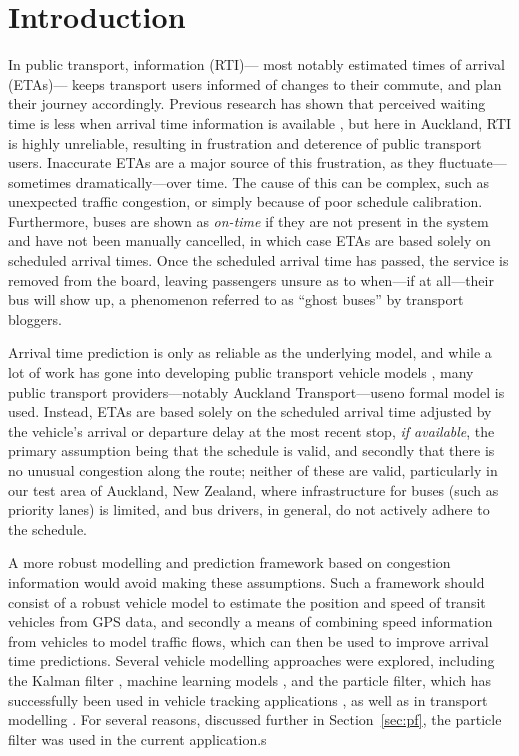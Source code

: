 \section{Introduction}
\label{sec:intro}


In public transport, \rt information (RTI)---%
most notably estimated times of arrival (ETAs)---%
keeps transport users informed of changes to their commute,
and plan their journey accordingly.
Previous research has shown that perceived waiting time is less
when arrival time information is available \citep{TCRP_2003b},
but here in Auckland, RTI is highly unreliable,
resulting in frustration and deterence of public transport users.
Inaccurate ETAs are a major source of this frustration,
as they fluctuate---sometimes dramatically---over time.
The cause of this can be complex, such as unexpected traffic congestion,
or simply because of poor schedule calibration.
Furthermore, buses are shown as \emph{on-time} 
if they are not present in the \rt system and have not been manually cancelled,
in which case ETAs are based solely on scheduled arrival times.
Once the scheduled arrival time has passed,
the service is removed from the \rt board,
leaving passengers unsure as to when---if at all---their bus will show up,
a phenomenon referred to as ``ghost buses'' by transport bloggers.


Arrival time prediction is only as reliable as the underlying model,
and while a lot of work has gone into developing public transport vehicle models
\citep{Cathey_2003,Jeong_2005,Yu_2011,Hans_2015},
many public transport providers---notably Auckland Transport---useno formal model is used.
Instead, ETAs are based solely on the scheduled arrival time
adjusted by the vehicle's arrival or departure delay at the most recent stop, 
\emph{if available},
the primary assumption being that the schedule is valid,
and secondly that there is no unusual congestion along the route;
neither of these are valid,
particularly in our test area of Auckland, New Zealand,
where infrastructure for buses (such as priority lanes) is limited,
and bus drivers, in general, 
do not actively adhere to the schedule.


A more robust modelling and prediction framework 
based on \rt congestion information would avoid making these assumptions.
Such a framework should consist of a robust vehicle model to estimate the position and speed
of transit vehicles from \rt GPS data,
and secondly a means of combining speed information from vehicles
to model traffic flows,
which can then be used to improve arrival time predictions.
Several vehicle modelling approaches were explored, 
including the Kalman filter \citep{Dailey_2001,Cathey_2003},
machine learning models \citep{Yu_2006,Chang_2010},
and the particle filter,
which has successfully been used in vehicle tracking applications
\citep{cn},
as well as in transport modelling \citep{Hans_2015}.
For several reasons, discussed further in Section~\ref{sec:pf},
the particle filter was used in the current application.s


